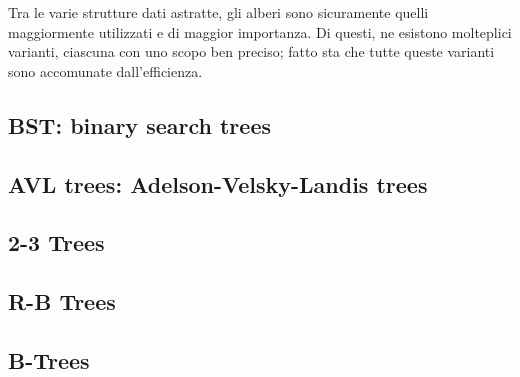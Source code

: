 \documentclass{subfiles}
\begin{document}
Tra le varie strutture dati astratte, gli alberi sono sicuramente quelli maggiormente utilizzati e di maggior importanza.
Di questi, ne esistono molteplici varianti, ciascuna con uno scopo ben preciso; fatto sta che tutte queste varianti sono accomunate dall'efficienza.

\subsection{BST: binary search trees}


\subsection{AVL trees: Adelson-Velsky-Landis trees}

\clearpage %

\subsection{2-3 Trees}


\subsection{R-B Trees}


\subsection{B-Trees}

\end{document}
